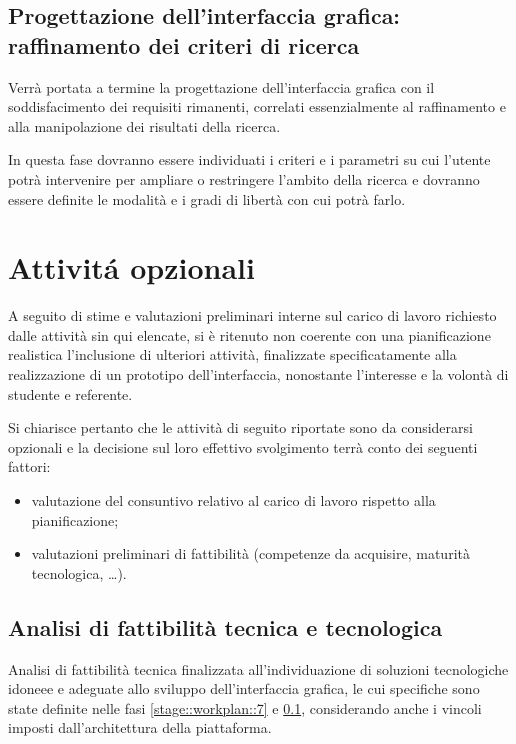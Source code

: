 \documentclass[10pt,a4paper,hidelinks]{scrartcl} %
\begin{document}
	\subsection{Progettazione dell'interfaccia grafica: raffinamento dei criteri di ricerca}
	\label{stage::workplan::8}
	Verrà portata a termine la progettazione dell'interfaccia grafica con il soddisfacimento dei requisiti rimanenti, correlati essenzialmente al raffinamento e alla manipolazione dei risultati della ricerca.

	In questa fase dovranno essere individuati i criteri e i parametri su cui l'utente potrà intervenire per ampliare o restringere l'ambito della ricerca e dovranno essere definite le modalità e i gradi di libertà con cui potrà farlo.

	\section{Attivit\'a opzionali}
	A seguito di stime e valutazioni preliminari interne sul carico di lavoro richiesto dalle attività sin qui elencate, si è ritenuto non coerente con una pianificazione realistica l'inclusione di ulteriori attività, finalizzate specificatamente alla realizzazione di un prototipo dell'interfaccia, nonostante l'interesse e la volontà di studente e referente.

	Si chiarisce pertanto che le attività di seguito riportate sono da considerarsi opzionali e la decisione sul loro effettivo svolgimento terrà conto dei seguenti fattori:
	\begin{itemize}
	\item valutazione del consuntivo relativo al carico di lavoro rispetto alla pianificazione;
	\item valutazioni preliminari di fattibilità (competenze da acquisire, maturità tecnologica, \ldots).
	\end{itemize}

	\subsection{Analisi di fattibilità tecnica e tecnologica}
	\label{stage::workplan::9}
	Analisi di fattibilità tecnica finalizzata all'individuazione di soluzioni tecnologiche idoneee e adeguate allo sviluppo dell'interfaccia grafica, le cui specifiche sono state definite nelle fasi \ref{stage::workplan::7} e \ref{stage::workplan::8}, considerando anche i vincoli imposti dall'architettura della piattaforma.
\end{document}
